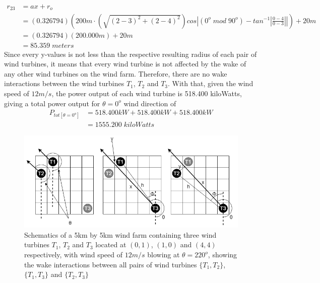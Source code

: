     \begin{align*}
        r_{23}
        &= ax+r_o \\
        &= (0.326794)\left( 200m\cdot \left( \sqrt{(2-3)^2+(2-4)^2} \right)cos \left| (0^o\;mod\;90^o) - tan^{-1}\left|\frac{0-4}{0-3}\right| \right| \right) + 20m \\
        &=(0.326794)(200.000m)+20m \\
        &= 85.359\;meters
    \end{align*}
    Since every y-values is not less than the respective resulting radius of each pair of wind turbines, it means that every wind turbine is not affected by the wake of any other wind turbines on the wind farm. Therefore, there are no wake interactions between the wind turbines $T_1$, $T_2$ and $T_3$. With that, given the wind speed of $12m/s$, the power output of each wind turbine is 518.400 kiloWatts, giving a total power output for $\theta=0^o$ wind direction of
	\begin{align*}
		P_{tot[\theta=0^o]} &= 518.400kW + 518.400kW + 518.400kW \\
		&=1555.200\;kiloWatts
	\end{align*}
    
    \begin{figure}
        \centering
        \includegraphics[width=\linewidth]{Figures/011044-220.png}
        \caption{Schematics of a 5km by 5km wind farm containing three wind turbines $T_1$, $T_2$ and $T_3$ located at $(0,1)$, $(1,0)$ and $(4,4)$ respectively, with wind speed of $12m/s$ blowing at $\theta=220^o$, showing the wake interactions between all pairs of wind turbines $\{T_1,T_2\}$, $\{T_1,T_3\}$ and $\{T_2,T_3\}$ }
        \label{011044-220}
    \end{figure}
    
